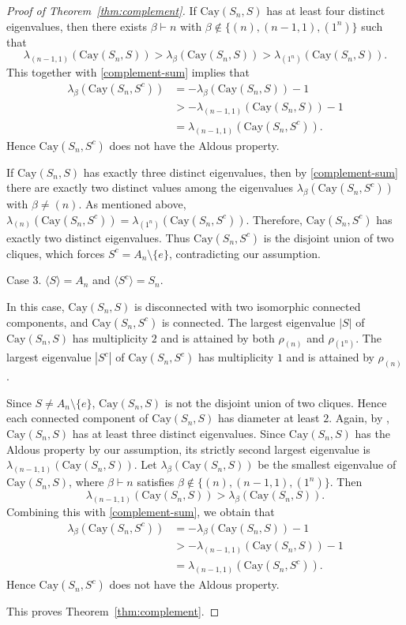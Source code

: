 \documentclass[12pt, a4paper]{article}
\theoremstyle{definition}
\begin{document}
\begin{proof}[Proof of Theorem~\ref{thm:complement}]
If $\mathrm{Cay}(S_n,S)$ has at least four distinct eigenvalues, then there exists $\beta\vdash n$ with $\beta\notin\{(n),(n-1,1),(1^n)\}$ such that
\[
\lambda_{(n-1,1)}(\mathrm{Cay}(S_n,S)) > \lambda_{\beta}(\mathrm{Cay}(S_n,S)) > \lambda_{(1^n)}(\mathrm{Cay}(S_n,S)).
\]
This together with \eqref{complement-sum} implies that
\begin{align*}
\lambda_{\beta}(\mathrm{Cay}(S_n,S^c))
&=-\lambda_{\beta}(\mathrm{Cay}(S_n,S))-1 \\
&> -\lambda_{(n-1,1)}(\mathrm{Cay}(S_n,S))-1 \\
&= \lambda_{(n-1,1)}(\mathrm{Cay}(S_n,S^c)).
\end{align*}
Hence $\mathrm{Cay}(S_n,S^c)$ does not have the Aldous property.

If $\mathrm{Cay}(S_n,S)$ has exactly three distinct eigenvalues, then by \eqref{complement-sum} there are exactly two distinct values among the eigenvalues $\lambda_{\beta}(\mathrm{Cay}(S_n,S^c))$ with $\beta\neq (n)$. As mentioned above,
\(
\lambda_{(n)}(\mathrm{Cay}(S_n,S^c))=\lambda_{(1^n)}(\mathrm{Cay}(S_n,S^c)).
\)
Therefore, $\mathrm{Cay}(S_n,S^c)$ has exactly two distinct eigenvalues. Thus $\mathrm{Cay}(S_n,S^c)$ is the disjoint union of two cliques, which forces $S^c=A_n\setminus\{e\}$, contradicting our assumption. 

\smallskip
\textsf{Case 3.} $\langle S\rangle=A_n$ and $\langle S^c\rangle=S_n$.
\smallskip

In this case, $\mathrm{Cay}(S_n,S)$ is disconnected with two isomorphic connected components, and  $\mathrm{Cay}(S_n,S^c)$ is connected. The largest eigenvalue $|S|$ of $\mathrm{Cay}(S_n,S)$ has multiplicity $2$ and is attained by both $\rho_{(n)}$ and $\rho_{(1^n)}$. The largest eigenvalue $|S^c|$ of $\mathrm{Cay}(S_n,S^c)$ has multiplicity $1$ and is attained by $\rho_{(n)}$.

Since $S\neq A_n\setminus\{e\}$, $\mathrm{Cay}(S_n,S)$ is not the disjoint union of two cliques. Hence each connected component of $\mathrm{Cay}(S_n,S)$ has diameter at least $2$. Again, by \cite[Lemma 8.12.1]{GR2001}, $\mathrm{Cay}(S_n,S)$ has at least three distinct eigenvalues. Since $\mathrm{Cay}(S_n,S)$ has the Aldous property by our assumption, its strictly second largest eigenvalue is 
$\lambda_{(n-1,1)}(\mathrm{Cay}(S_n,S))$. Let $\lambda_{\beta}(\mathrm{Cay}(S_n,S))$ be the smallest eigenvalue of $\mathrm{Cay}(S_n,S)$, where $\beta\vdash n$ satisfies $\beta\notin\{(n),(n-1,1),(1^n)\}$. Then
\[
\lambda_{(n-1,1)}(\mathrm{Cay}(S_n,S)) > \lambda_{\beta}(\mathrm{Cay}(S_n,S)).
\]
Combining this with \eqref{complement-sum}, we obtain that
\begin{align*}
\lambda_{\beta}(\mathrm{Cay}(S_n,S^c))
&=-\lambda_{\beta}(\mathrm{Cay}(S_n,S))-1 \\
&> -\lambda_{(n-1,1)}(\mathrm{Cay}(S_n,S))-1 \\ 
&= \lambda_{(n-1,1)}(\mathrm{Cay}(S_n,S^c)).
\end{align*}
Hence $\mathrm{Cay}(S_n,S^c)$ does not have the Aldous property.

This proves Theorem~\ref{thm:complement}. 
\end{proof}
\end{document}
